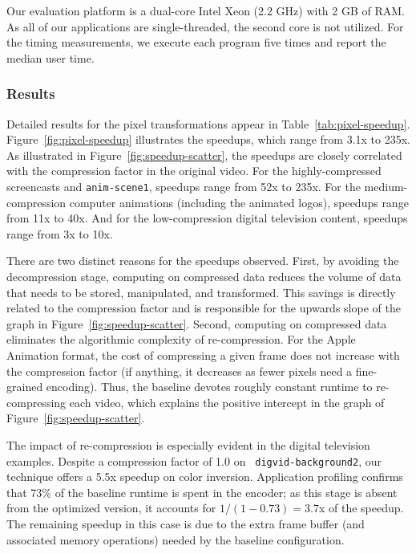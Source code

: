 Our evaluation platform is a dual-core Intel Xeon (2.2 GHz) with 2 GB
of RAM.  As all of our applications are single-threaded, the second
core is not utilized.  For the timing measurements, we execute each
program five times and report the median user time.

\subsubsection{Results}

Detailed results for the pixel transformations appear in
Table~\ref{tab:pixel-speedup}.  Figure~\ref{fig:pixel-speedup}
illustrates the speedups, which range from 3.1x to 235x.  As
illustrated in Figure~\ref{fig:speedup-scatter}, the speedups
are closely correlated with the compression factor in the original
video.  For the highly-compressed screencasts and {\tt anim-scene1},
speedups range from 52x to 235x.  For the medium-compression computer
animations (including the animated logos), speedups range from 11x to
40x.  And for the low-compression digital television content, speedups
range from 3x to 10x.

There are two distinct reasons for the speedups observed.  First, by
avoiding the decompression stage, computing on compressed data reduces
the volume of data that needs to be stored, manipulated, and
transformed.  This savings is directly related to the compression
factor and is responsible for the upwards slope of the graph in
Figure~\ref{fig:speedup-scatter}.  Second, computing on compressed
data eliminates the algorithmic complexity of re-compression.  For the
Apple Animation format, the cost of compressing a given frame does not
increase with the compression factor (if anything, it decreases as
fewer pixels need a fine-grained encoding).  Thus, the baseline
devotes roughly constant runtime to re-compressing each video, which
explains the positive intercept in the graph of
Figure~\ref{fig:speedup-scatter}.

The impact of re-compression is especially evident in the digital
television examples.  Despite a compression factor of 1.0 on {\tt
digvid-background2}, our technique offers a 5.5x speedup on color
inversion.  Application profiling confirms that 73\% of the baseline
runtime is spent in the encoder; as this stage is absent from the
optimized version, it accounts for $1/(1-0.73) = 3.7$x of the speedup.
The remaining speedup in this case is due to the extra frame buffer
(and associated memory operations) needed by the baseline
configuration.  
%
%

